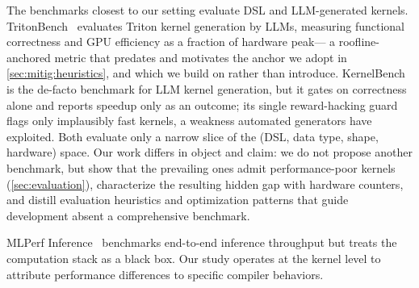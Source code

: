 The benchmarks closest to our setting evaluate DSL and LLM-generated kernels.
TritonBench~\cite{li2025tritonbench} evaluates Triton kernel generation by LLMs,
measuring functional correctness and GPU efficiency as a fraction of hardware peak---
a roofline-anchored metric that predates and motivates the anchor we adopt in \cref{sec:mitig:heuristics}, and which we build on rather than introduce.
KernelBench~\cite{kernelbench} is the de-facto benchmark for LLM kernel generation,
but it gates on correctness alone and reports speedup only as an outcome;
its single reward-hacking guard flags only implausibly fast kernels, a weakness automated generators have exploited.
Both evaluate only a narrow slice of the (DSL, data type, shape, hardware) space.
Our work differs in object and claim: we do not propose another benchmark, but show that the prevailing ones admit performance-poor kernels (\cref{sec:evaluation}), characterize the resulting hidden gap with hardware counters, and distill evaluation heuristics and optimization patterns that guide development absent a comprehensive benchmark.

MLPerf Inference~\cite{reddi2020mlperf} benchmarks end-to-end inference throughput
but treats the computation stack as a black box.
Our study operates at the kernel level
to attribute performance differences to specific compiler behaviors.
